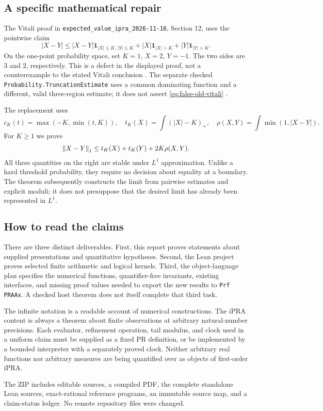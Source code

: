 \subsection{A specific mathematical repair}

The Vitali proof in
\texttt{expected\_value\_ipra\_2026-11-16}, Section 12, uses the pointwise claim
\begin{equation}\label{eq:false-old-vitali}
 |X-Y|\le |X-Y|\mathbf1_{|X|\le K,\,|Y|\le K}
       +|X|\mathbf1_{|X|>K}+|Y|\mathbf1_{|Y|>K}.
\end{equation}
On the one-point probability space, set $K=1$, $X=2$, $Y=-1$.
The two sides are $3$ and $2$, respectively. This is a defect in the
displayed proof, not a counterexample to the stated Vitali conclusion
\cite{repo-expectation-packet}. The separate checked
\texttt{Probability.TruncationEstimate} uses a common dominating function
and a different, valid three-region estimate; it does not assert
\eqref{eq:false-old-vitali} \cite{repo-truncation}.

The replacement uses
\[
 c_K(t)=\max(-K,\min(t,K)),\quad
 t_K(X)=\int (|X|-K)_+,\quad
 \rho(X,Y)=\int\min(1,|X-Y|).
\]
For $K\ge1$ we prove
\begin{equation}\label{eq:main-vitali-intro}
 \left\lVert X-Y\right\rVert_1\le t_K(X)+t_K(Y)+2K\rho(X,Y).
\end{equation}
All three quantities on the right are stable under $L^1$ approximation.
Unlike a hard threshold probability, they require no decision about equality
at a boundary. The theorem subsequently constructs the limit from pairwise
estimates and explicit moduli; it does not presuppose that the desired limit
has already been represented in $L^1$.

\subsection{How to read the claims}

There are three distinct deliverables. First, this report proves statements
about supplied presentations and quantitative hypotheses. Second, the Lean
project proves selected finite arithmetic and logical kernels. Third, the
object-language plan specifies the numerical functions, quantifier-free
invariants, existing interfaces, and missing proof values needed to export
the new results to \texttt{Prf PRAAx}. A checked host theorem does not itself
complete that third task.

The infinite notation is a readable account of numerical constructions.
The iPRA content is always a theorem about finite observations at arbitrary
natural-number precisions. Each evaluator, refinement operation, tail
modulus, and clock used in a uniform claim must be supplied as a fixed PR
definition, or be implemented by a bounded interpreter with a separately
proved clock. Neither arbitrary real functions nor arbitrary measures are
being quantified over as objects of first-order iPRA.

The ZIP includes editable sources, a compiled PDF, the complete standalone
Lean sources, exact-rational reference programs, an immutable source map,
and a claim-status ledger. No remote repository files were changed.
